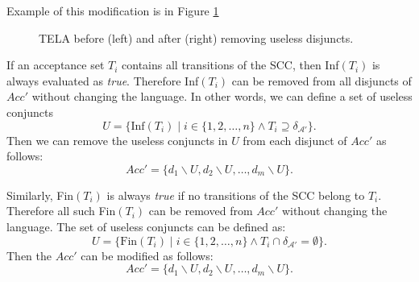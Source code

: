 \documentclass[
  digital, %
  twoside, %
  table,   %
  lof,     %
  lot,     %
]{fithesis3}
\begin{document}
Example of this modification is in Figure \ref{fig:rem_dis_inf}

\begin{figure}[h]
  \centering
  \caption{TELA before (left) and after (right) removing useless disjuncts.}
  \label{fig:rem_dis_inf}
\end{figure}

If an acceptance set $T_i$ contains all transitions of the SCC, then Inf$(T_i)$ is always evaluated as \emph{true}. Therefore Inf$(T_i)$ can be removed from all disjuncts of $Acc'$ without changing the language. 
In other words, we can define a set of useless conjuncts 
\begin{equation*}
  U = \{\text{Inf}(T_i) \mid i \in \{1,2, \dots, n\} \wedge T_i \supseteq \delta_{\mathcal{A'}}\}.
\end{equation*}
Then we can remove the useless conjuncts in $U$ from each disjunct of $Acc'$ as follows:
\begin{equation*}
  Acc' = \{d_1 \smallsetminus U, d_2 \smallsetminus U, \dots, d_m \smallsetminus U\}.
\end{equation*}

Similarly, Fin$(T_i)$ is always \emph{true} if no transitions of the SCC belong to $T_i$. Therefore all such Fin$(T_i)$ can be removed from $Acc'$ without changing the language.
The set of useless conjuncts can be defined as:
\begin{equation*}
  U = \{\text{Fin}(T_i) \mid i \in \{1,2, \dots, n\} \wedge T_i \cap \delta_{\mathcal{A'}} = \emptyset\}.
\end{equation*}
Then the $Acc'$ can be modified as follows:
\begin{equation*}
  Acc' = \{d_1 \smallsetminus U, d_2 \smallsetminus U, \dots, d_m \smallsetminus U\}.
\end{equation*}
\end{document}
